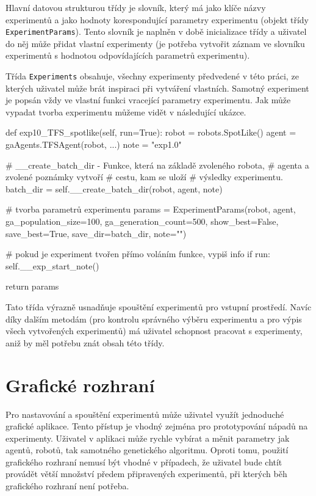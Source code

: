 Hlavní datovou strukturou třídy je slovník, který má jako klíče názvy
experimentů a jako hodnoty korespondující parametry experimentu (objekt třídy
\texttt{ExperimentParams}). Tento slovník je naplněn v době inicializace třídy
a uživatel do něj může přidat vlastní experimenty (je potřeba vytvořit záznam
ve slovníku experimentů s hodnotou odpovídajících parametrů experimentu).

Třída \texttt{Experiments} obsahuje, všechny experimenty předvedené v této
práci, ze kterých uživatel může brát inspiraci při vytváření vlastních. Samotný
experiment je popsán vždy ve vlastní funkci vracející parametry experimentu.
Jak může vypadat tvorba experimentu můžeme vidět v následující ukázce.

\begin{code}
def exp10_TFS_spotlike(self, run=True):
    robot = robots.SpotLike()
    agent = gaAgents.TFSAgent(robot, ...)
    note = "exp1.0"

    # __create_batch_dir - Funkce, která na základě zvoleného robota, 
    # agenta a zvolené poznámky vytvoří # cestu, kam se uloží 
    # výsledky experimentu.
    batch_dir = self.__create_batch_dir(robot, agent, note) 

    # tvorba parametrů experimentu
    params = ExperimentParams(robot, 
                              agent,
                              ga_population_size=100,
                              ga_generation_count=500,
                              show_best=False,
                              save_best=True,
                              save_dir=batch_dir,
                              note="")

    # pokud je experiment tvořen přímo voláním funkce, vypiš info
    if run: 
        self.__exp_start_note()

    return params
\end{code}

Tato třída výrazně usnadňuje spouštění experimentů pro vstupní prostředí. Navíc
díky dalším metodám (pro kontrolu správného výběru experimentu a pro výpis
všech vytvořených experimentů) má uživatel schopnost pracovat s experimenty,
aniž by měl potřebu znát obsah této třídy.

\section{Grafické rozhraní} \label{imp:GUI}
Pro nastavování a spouštění experimentů může uživatel využít jednoduché
grafické aplikace. Tento přístup je vhodný zejména pro prototypování nápadů na
experimenty. Uživatel v aplikaci může rychle vybírat a měnit parametry jak
agentů, robotů, tak samotného genetického algoritmu. Oproti tomu, použití
grafického rozhraní nemusí být vhodné v případech, že uživatel bude chtít
provádět větší množství předem připravených experimentů, při kterých běh
grafického rozhraní není potřeba.

